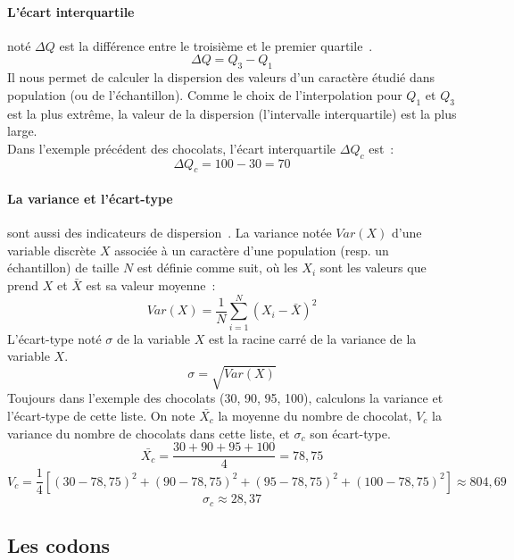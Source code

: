 \documentclass[12pt]{article}
\begin{document}
\paragraph{L'écart interquartile} noté $\Delta Q$ est la différence entre le troisième et le premier quartile~\cite{EI}.
    \begin{equation}
        \Delta Q = Q_3 - Q_1
        \label{intquart}
    \end{equation}
Il nous permet de calculer la dispersion des valeurs d'un caractère étudié dans population (ou de l'échantillon). Comme le choix de l'interpolation pour $Q_1$ et $Q_3$ est la plus extrême, la valeur de la dispersion (l'intervalle interquartile) est la plus large.\\
Dans l'exemple précédent des chocolats, l'écart interquartile $\Delta Q_c$ est~:
\[\Delta Q_c = 100 - 30 = 70\]

\paragraph{La variance et l'écart-type} sont aussi des indicateurs de dispersion~\cite{dispersion}. La variance notée $Var(X)$ d'une variable discrète $X$ associée à un caractère d'une population (resp. un échantillon) de taille $N$ est définie comme suit, où les $X_i$ sont les valeurs que prend $X$ et $\bar{X}$ est sa valeur moyenne~:
    \begin{equation}
        Var(X) = \frac{1}{N} \sum_{i=1}^{N} (X_i-\bar{X})^2
        \label{var}
    \end{equation}
L'écart-type noté $\sigma$ de la variable $X$ est la racine carré de la variance de la variable $X$.
    \begin{equation}
        \sigma = \sqrt{Var(X)}
        \label{ecartt}
    \end{equation}
Toujours dans l'exemple des chocolats (30, 90, 95, 100), calculons la variance et l'écart-type de cette liste. On note $\bar{X_c}$ la moyenne du nombre de chocolat, $V_c$ la variance du nombre de chocolats dans cette liste, et $\sigma_c$ son écart-type.
    \[\bar{X_c} = \frac{30 + 90 + 95 + 100}{4} = 78,75\]
    \[V_c = \frac{1}{4}[(30 - 78,75)^2 + (90 - 78,75)^2 + (95 - 78,75)^2 + (100 - 78,75)^2] \approx 804,69\]
    \[\sigma_c \approx 28,37\]

\subsection{Les codons} 
 
\end{document}
